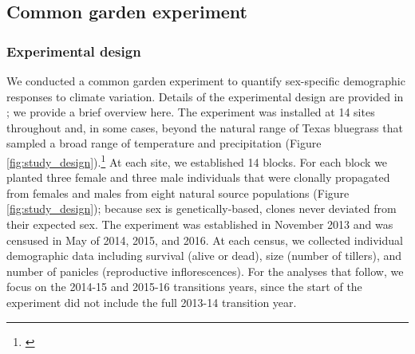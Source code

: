 \documentclass[12pt]{article}\usepackage[]{graphicx}\usepackage[dvipsnames]{xcolor}
\newcommand{\tom}[2]{{\color{red}{#1}}\footnote{\textit{\color{red}{#2}}}}
\begin{document}
\subsection*{Common garden experiment}
\subsubsection*{Experimental design}
We conducted a common garden experiment to quantify sex-specific demographic responses to climate variation. 
Details of the experimental design are provided in \cite{miller2022two}; we provide a brief overview here. 
The experiment was installed at 14 sites throughout and, in some cases, beyond the natural range of Texas bluegrass that sampled a broad range of temperature and precipitation (Figure \ref{fig:study_design}).\tom{}{A few comments about figure 1 (I cannot comment in the legend). Please update the gray diamonds as GBIF occurrences, not natural population surveys. Please add ``mm'' and ``\degree C'' to the titles. It would also be good to spell out ``growing'' and ``dormant'' seasons.}
At each site, we established 14 blocks. 
For each block we planted three female and three male individuals that were clonally propagated from females and males from eight natural source populations (Figure \ref{fig:study_design}); because sex is genetically-based, clones never deviated from their expected sex. 
The experiment was established in November 2013 and was censused in May of 2014, 2015, and 2016. 
At each census, we collected individual demographic data including survival (alive or dead), size (number of tillers), and number of panicles (reproductive inflorescences). 
For the analyses that follow, we focus on the 2014-15 and 2015-16 transitions years, since the start of the experiment did not include the full 2013-14 transition year.
\end{document}
